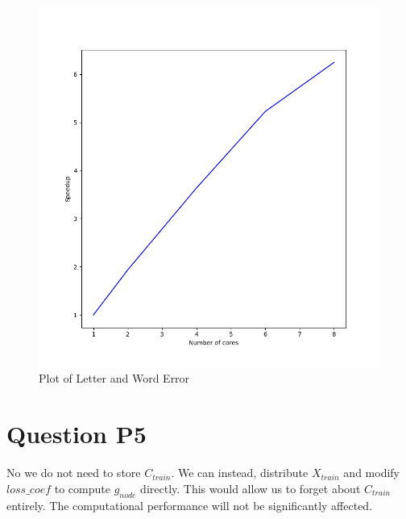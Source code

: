\documentclass[11pt]{report}
\begin{document}
\begin{figure}[b]
\centering
\includegraphics[scale=0.4]{p4_figure.png}
\caption{Plot of Letter and Word Error}
\end{figure}

\section*{Question P5}
No we do not need to store $C_{train}$. We can instead, distribute $X_{train}$
and modify $loss\_coef$ to compute $g_{node}$ directly. This would allow us to
forget about $C_{train}$ entirely. The computational performance will not be 
significantly affected.
\end{document}
